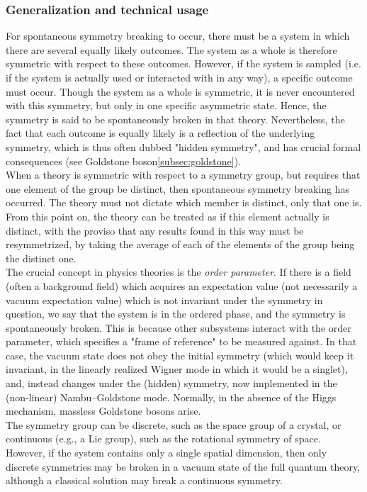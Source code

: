 \subsubsection{Generalization and technical usage}
For spontaneous symmetry breaking to occur, there must be a system in which there are several equally likely outcomes. The system as a whole is therefore symmetric with respect to these outcomes. However, if the system is sampled (i.e. if the system is actually used or interacted with in any way), a specific outcome must occur. Though the system as a whole is symmetric, it is never encountered with this symmetry, but only in one specific asymmetric state. Hence, the symmetry is said to be spontaneously broken in that theory. Nevertheless, the fact that each outcome is equally likely is a reflection of the underlying symmetry, which is thus often dubbed "hidden symmetry", and has crucial formal consequences (see Goldstone boson\ref{subsec:goldstone}).\\
When a theory is symmetric with respect to a symmetry group, but requires that one element of the group be distinct, then spontaneous symmetry breaking has occurred. The theory must not dictate which member is distinct, only that one is. From this point on, the theory can be treated as if this element actually is distinct, with the proviso that any results found in this way must be resymmetrized, by taking the average of each of the elements of the group being the distinct one.
\\
The crucial concept in physics theories is the \emph{order parameter}. If there is a field (often a background field) which acquires an expectation value (not necessarily a vacuum expectation value) which is not invariant under the symmetry in question, we say that the system is in the ordered phase, and the symmetry is spontaneously broken. This is because other subsystems interact with the order parameter, which specifies a "frame of reference" to be measured against. In that case, the vacuum state does not obey the initial symmetry (which would keep it invariant, in the linearly realized Wigner mode in which it would be a singlet), and, instead changes under the (hidden) symmetry, now implemented in the (non-linear) Nambu–Goldstone mode. Normally, in the absence of the Higgs mechanism, massless Goldstone bosons arise.\\
The symmetry group can be discrete, such as the space group of a crystal, or continuous (e.g., a Lie group), such as the rotational symmetry of space. However, if the system contains only a single spatial dimension, then only discrete symmetries may be broken in a vacuum state of the full quantum theory, although a classical solution may break a continuous symmetry.

